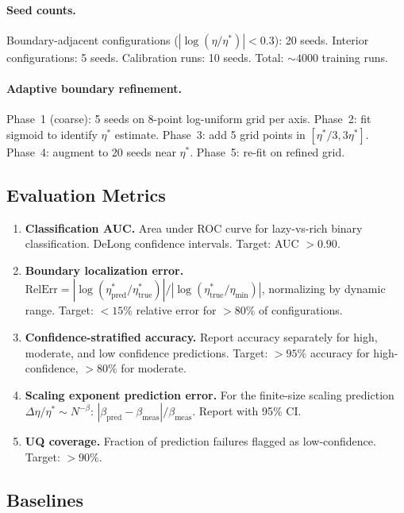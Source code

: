 \documentclass[11pt]{article}
\theoremstyle{definition}
\begin{document}
\paragraph{Seed counts.} Boundary-adjacent configurations ($|\log(\eta/\eta^*)| < 0.3$): 20 seeds. Interior configurations: 5 seeds. Calibration runs: 10 seeds. Total: $\sim 4000$ training runs.

\paragraph{Adaptive boundary refinement.} Phase~1 (coarse): 5 seeds on 8-point log-uniform grid per axis. Phase~2: fit sigmoid to identify $\eta^*$ estimate. Phase~3: add 5 grid points in $[\eta^*/3, 3\eta^*]$. Phase~4: augment to 20 seeds near $\eta^*$. Phase~5: re-fit on refined grid.

\subsection{Evaluation Metrics}
\label{sec:metrics}

\begin{enumerate}[leftmargin=*]
\item \textbf{Classification AUC.} Area under ROC curve for lazy-vs-rich binary classification. DeLong confidence intervals. Target: AUC $> 0.90$.

\item \textbf{Boundary localization error.} $\mathrm{RelErr} = |\log(\eta^*_{\mathrm{pred}}/\eta^*_{\mathrm{true}})| / |\log(\eta^*_{\mathrm{true}}/\eta_{\min})|$, normalizing by dynamic range. Target: $< 15\%$ relative error for $> 80\%$ of configurations.

\item \textbf{Confidence-stratified accuracy.} Report accuracy separately for high, moderate, and low confidence predictions. Target: $> 95\%$ accuracy for high-confidence, $> 80\%$ for moderate.

\item \textbf{Scaling exponent prediction error.} For the finite-size scaling prediction $\Delta\eta/\eta^* \sim N^{-\beta}$: $|\beta_{\mathrm{pred}} - \beta_{\mathrm{meas}}| / \beta_{\mathrm{meas}}$. Report with 95\% CI.

\item \textbf{UQ coverage.} Fraction of prediction failures flagged as low-confidence. Target: $> 90\%$.
\end{enumerate}

\subsection{Baselines}
\label{sec:baselines}
\end{document}
